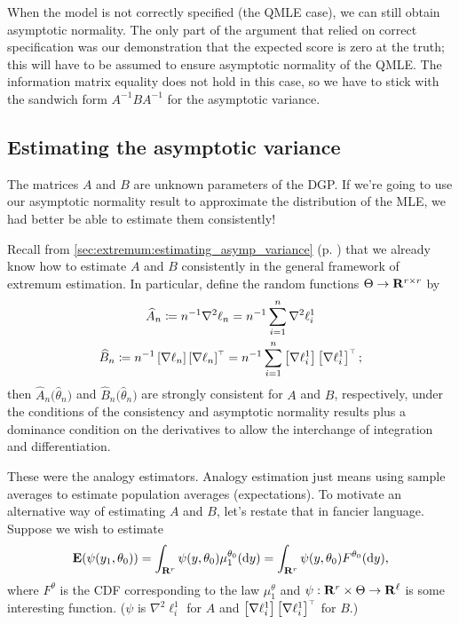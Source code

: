\documentclass[11pt,letterpaper,reqno,oneside]{article}
\begin{document}
When the model is not correctly specified (the QMLE case), we can still obtain asymptotic normality. The only part of the argument that relied on correct specification was our demonstration that the expected score is zero at the truth; this will have to be assumed to ensure asymptotic normality of the QMLE. The information matrix equality does not hold in this case, so we have to stick with the sandwich form $A^{-1} B A^{-1}$ for the asymptotic variance.




\subsection{Estimating the asymptotic variance}
\label{sec:MLE:estimating_asymp_variance}

The matrices $A$ and $B$ are unknown parameters of the DGP. If we're going to use our asymptotic normality result to approximate the distribution of the MLE, we had better be able to estimate them consistently!

Recall from \cref{sec:extremum:estimating_asymp_variance} (p. \pageref{sec:extremum:estimating_asymp_variance}) that we already know how to estimate $A$ and $B$ consistently in the general framework of extremum estimation. In particular, define the random functions $\Theta \to \mathbf{R}^{r \times r}$ by
%
\begin{gather*}
	\widehat{A}_n
	\coloneqq n^{-1} \nabla^2 \ell_n
	= n^{-1} \sum_{i=1}^n \nabla^2 \ell^1_i 
	\\
	\widehat{B}_n
	\coloneqq n^{-1} \left[ \nabla \ell_n \right] 
	\left[ \nabla \ell_n \right]^{\scriptscriptstyle \top}
	= n^{-1} \sum_{i=1}^n \left[ \nabla \ell^1_i \right] 
	\left[ \nabla \ell^1_i \right]^{\scriptscriptstyle \top} ;
\end{gather*}
%
then $\widehat{A}_n\bigl( \widehat{\theta}_n \bigr)$ and $\widehat{B}_n\bigl( \widehat{\theta}_n \bigr)$ are strongly consistent for $A$ and $B$, respectively, under the conditions of the consistency and asymptotic normality results plus a dominance condition on the derivatives to allow the interchange of integration and differentiation.


These were the analogy estimators. Analogy estimation just means using sample averages to estimate population averages (expectations). To motivate an alternative way of estimating $A$ and $B$, let's restate that in fancier language. Suppose we wish to estimate
%
\begin{equation*}
	\mathbf{E}(\psi(y_1,\theta_0)) 
	= \int_{\mathbf{R}^r} \psi(y,\theta_0) \mu_1^{\theta_0}(\mathrm{d} y) 
	= \int_{\mathbf{R}^r} \psi(y,\theta_0) F^{\theta_0}(\mathrm{d} y) ,
\end{equation*}
%
where $F^\theta$ is the CDF corresponding to the law $\mu_1^\theta$ and $\psi : \mathbf{R}^r \times \Theta \to \mathbf{R}^\ell$ is some interesting function. ($\psi$ is $\nabla^2 \ell^1_i$ for $A$ and $\left[ \nabla \ell^1_i \right] \left[ \nabla \ell^1_i \right]^{\scriptscriptstyle \top}$ for $B$.)
\end{document}
